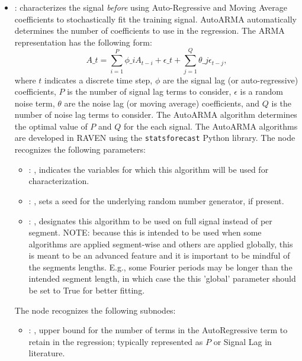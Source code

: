 \begin{itemize}
    \item {}:
      characterizes the signal \textit{before} using Auto-Regressive and         Moving Average
      coefficients to stochastically fit the training signal. AutoARMA         automatically
      determines the number of coefficients to use in the regression.         The ARMA
      representation has the following form:         \begin{equation*}           A\_t = \sum_{i=1}^P
      \phi\_i A_{t-i} + \epsilon\_t + \sum_{j=1}^Q \theta\_j \epsilon_{t-j},         \end{equation*}
      where $t$ indicates a discrete time step, $\phi$ are the signal lag (or auto-regressive)
      coefficients, $P$ is the number of signal lag terms to consider, $\epsilon$ is a random noise
      term, $\theta$ are the noise lag (or moving average) coefficients, and $Q$ is the number of
      noise lag terms to consider. The AutoARMA algorithm determines the optimal value of $P$
      and $Q$ for the each signal. The AutoARMA algorithms are developed in RAVEN using the
      \texttt{statsforecast} Python library.
      The  node recognizes the following parameters:
        \begin{itemize}
          \item {}: , 
            indicates the variables for which this algorithm will be used for characterization.
          \item {}: , 
            sets a seed for the underlying random number generator, if present.
          \item {}: , 
            designates this algorithm to be used on full signal instead of per
            segment. NOTE: because this is intended to be used when some algorithms are
            applied segment-wise and others are applied globally, this is meant to be an
            advanced feature and it is important to be mindful of the segments lengths.
            E.g., some Fourier periods may be longer than the intended segment length, in
            which case the this 'global' parameter should be set to True for better
            fitting. 
      \end{itemize}

      The  node recognizes the following subnodes:
      \begin{itemize}
        \item {}: , 
          upper bound for the number of terms in the AutoRegressive term to retain
          in the regression; typically represented as $P$ or Signal Lag in
          literature.


\end{itemize}
\end{itemize}
